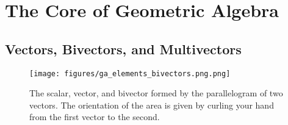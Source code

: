 \newpage
\section{The Core of Geometric Algebra}


\subsection{Vectors, Bivectors, and Multivectors}

\begin{figure}[H]
   \centering
   \texttt{[image: figures/ga\_elements\_bivectors.png.png]}
   \caption{The scalar, vector, and bivector formed by the parallelogram of two vectors. The orientation of the area is given by curling your hand from the first vector to the second.}
   \label{fig:ga_elements}
\end{figure}

